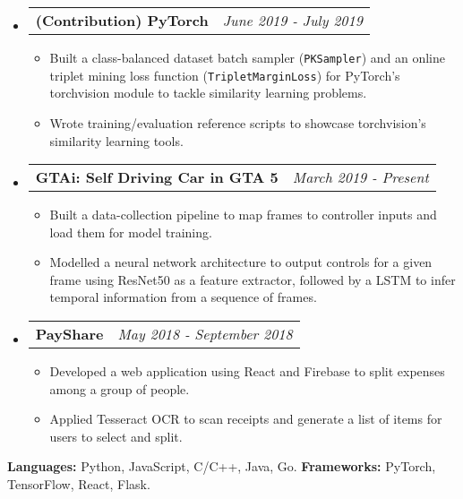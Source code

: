 \documentclass[letterpaper, 11pt]{article}
\makeatletter
\newcommand{\resitem}[1]{\item #1 \vspace{-2pt}}
\newcommand{\resheading}[1]{{\large \parashade[.9]{sharpcorners}{\textbf{#1 \vphantom{p\^{E}}}}}}
\newcommand{\ressubheadinga}[2]{
\begin{tabular*}{7.11in}{l@{\extracolsep{\fill}}r}
		\textbf{#1} & #2 \\
\end{tabular*}}
\makeatother
\begin{document}
\begin{itemize}
\item
    \ressubheadinga{(Contribution) PyTorch}{\emph{June 2019 - July 2019}}
    \vspace{-0.25in}
    \begin{itemize}
            \resitem{Built a class-balanced dataset batch sampler (\texttt{PKSampler}) and an online triplet mining loss function (\texttt{TripletMarginLoss}) for PyTorch's torchvision module to tackle similarity learning problems.}
            \resitem{Wrote training/evaluation reference scripts to showcase torchvision's similarity learning tools.}
    \end{itemize}

\item
    \ressubheadinga{GTAi: Self Driving Car in GTA 5}{\emph{March 2019 - Present}}
    \vspace{-0.25in}
    \begin{itemize}
            \resitem{Built a data-collection pipeline to map frames to controller inputs and load them for model training.}
            \resitem{Modelled a neural network architecture to output controls for a given frame using ResNet50 as a feature extractor, followed by a LSTM to infer temporal information from a sequence of frames.}
    \end{itemize}

\item
    \ressubheadinga{PayShare}{\emph{May 2018 - September 2018}}
    \vspace{-0.25in}
    \begin{itemize}
        \resitem{Developed a web application using React and Firebase to split expenses among a group of people.}
        \resitem{Applied Tesseract OCR to scan receipts and generate a list of items for users to select and split.}
    \end{itemize}

\end{itemize}

\vspace{-0.16in}
\resheading{Skills}
\vspace{-0.10in}

\textbf{Languages:} Python, JavaScript, C/C++, Java, Go. \textbf{Frameworks:} PyTorch, TensorFlow, React, Flask.
\end{document}
